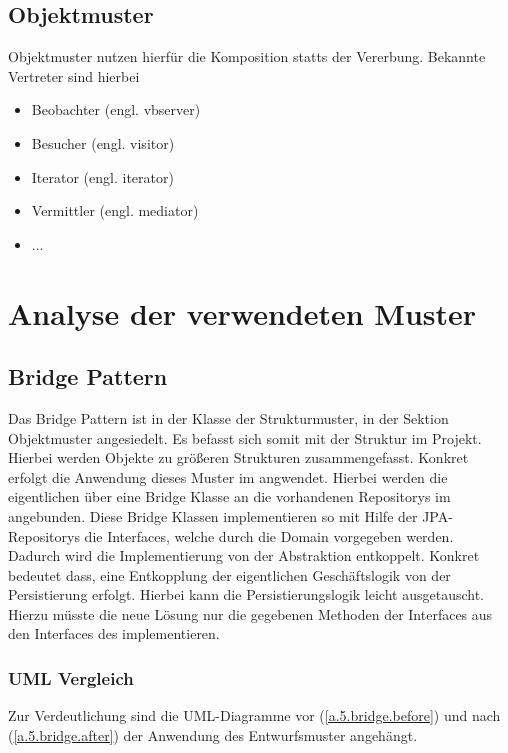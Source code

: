 			\subsection{Objektmuster}
			Objektmuster nutzen hierfür die Komposition statts der Vererbung. Bekannte Vertreter sind hierbei
			\begin{itemize}
				\item Beobachter (engl. vbserver)
				\item Besucher (engl. visitor)
				\item Iterator (engl. iterator)
				\item Vermittler (engl. mediator) %
				\item ...
			\end{itemize}
		
	\section{Analyse der verwendeten Muster}
		\subsection{Bridge Pattern}
		Das Bridge Pattern ist in der Klasse der Strukturmuster, in der Sektion Objektmuster angesiedelt. Es befasst sich somit mit der Struktur im Projekt. Hierbei werden Objekte zu größeren Strukturen zusammengefasst. Konkret erfolgt die Anwendung dieses Muster im  angwendet. Hierbei werden die eigentlichen  über eine Bridge Klasse an die vorhandenen Repositorys im  angebunden. Diese Bridge Klassen implementieren so mit Hilfe der JPA-Repositorys die Interfaces, welche durch die Domain vorgegeben werden. \\
		Dadurch wird die Implementierung von der Abstraktion entkoppelt. Konkret bedeutet dass, eine Entkopplung der eigentlichen Geschäftslogik von der Persistierung erfolgt. Hierbei kann die Persistierungslogik leicht ausgetauscht. Hierzu müsste die neue Lösung nur die gegebenen Methoden der Interfaces aus den Interfaces des  implementieren.
	
			\subsubsection{UML Vergleich}
			Zur Verdeutlichung sind die \ac{UML}-Diagramme vor (\cref{a.5.bridge.before}) und nach (\cref{a.5.bridge.after}) der Anwendung des Entwurfsmuster angehängt.
			
